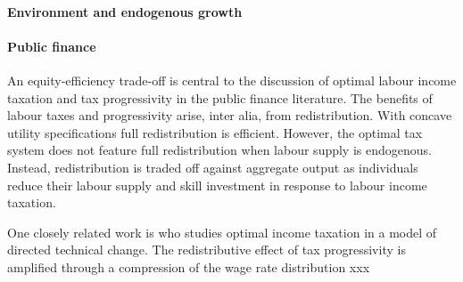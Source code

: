 \paragraph{Environment and endogenous growth}

\paragraph{Public finance}
An equity-efficiency trade-off is central to the discussion of optimal labour income taxation and tax progressivity in the public finance literature.  The benefits of labour taxes and progressivity arise, inter alia, from redistribution. %
With concave utility specifications full redistribution is efficient. However, the optimal tax system does not feature full redistribution when labour supply is endogenous. Instead, redistribution is traded off against aggregate output as individuals reduce their labour supply and skill investment in response to labour income taxation. 

One closely related work is \cite{Loebbing2019NationalChange} who studies optimal income taxation in a model of directed technical change. The redistributive effect of tax progressivity is amplified through a compression of the wage rate distribution xxx